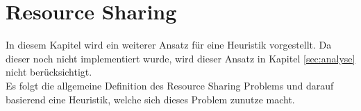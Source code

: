 \documentclass[11pt, a4paper, german]{article}
\newcommand{\TM}{Technology  Mapping }
\begin{document}

\section{Resource Sharing}\label{sec:resource_sh}
In diesem Kapitel wird ein weiterer Ansatz für eine Heuristik vorgestellt. Da dieser noch nicht implementiert wurde, wird dieser Ansatz in Kapitel \ref{sec:analyse} nicht berücksichtigt.\\
Es folgt die allgemeine Definition des Resource Sharing Problems und darauf basierend eine Heuristik, welche sich dieses Problem zunutze macht.\\
\end{document}

